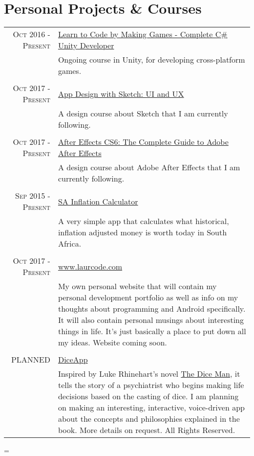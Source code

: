\documentclass[a4paper,10pt,notitlepage]{article}
\newenvironment{absolutelynopagebreak}
  {\par\nobreak\vfil\penalty0\vfilneg
   \vtop\bgroup}
  {\par\xdef\tpd{\the\prevdepth}\egroup
   \prevdepth=\tpd}
\begin{document}
\begin{absolutelynopagebreak}

\section{Personal Projects \& Courses}
\begin{tabular}{r|p{11cm}}

\textsc{Oct 2016 - Present} & \href{https://www.udemy.com/unitycourse/learn/v4/}{Learn to Code by Making Games - Complete C\# Unity Developer} \\&\footnotesize{Ongoing course in Unity, for developing cross-platform games.} \\

\multicolumn{2}{c}{}\\
\textsc{Oct 2017 - Present} &
\href{https://www.udemy.com/app-design-with-sketch-ui-and-ux/}{App Design with Sketch: UI and UX}\\&\footnotesize{A design course about Sketch that I am currently following.} \\

\multicolumn{2}{c}{}\\
\textsc{Oct 2017 - Present} &
\href{https://www.udemy.com/aftereffects/}{After Effects CS6: The Complete Guide to Adobe After Effects}\\&\footnotesize{A design course about Adobe After Effects that I am currently following.} \\

\multicolumn{2}{c}{}\\
\textsc{Sep 2015 - Present} &
\href{https://play.google.com/store/apps/details?id=za.co.inflationcalc}{SA Inflation Calculator}\\&\footnotesize{A very simple app that calculates what historical, inflation adjusted money is worth today in South Africa.} \\

\multicolumn{2}{c}{}\\
\textsc{Oct 2017 - Present} &
\href{www.laurcode.com}{www.laurcode.com}\\&\footnotesize{My own personal website that will contain my personal development portfolio as well as info on my thoughts about programming and Android specifically. It will also contain personal musings about interesting things in life. It's just basically a place to put down all my ideas. Website coming soon.} \\

\multicolumn{2}{c}{}\\
\textsc{PLANNED} &
\href{www.laurcode.com}{DiceApp}\\&\footnotesize{Inspired by Luke Rhinehart’s novel \href{https://en.wikipedia.org/wiki/The_Dice_Man}{The Dice Man}, it tells the story of a psychiatrist who begins making life decisions based on the casting of dice. I am planning on making an interesting, interactive, voice-driven app about the concepts and philosophies explained in the book. More details on request. All Rights Reserved.} \\


\end{tabular}
\end{absolutelynopagebreak}
\end{document}
